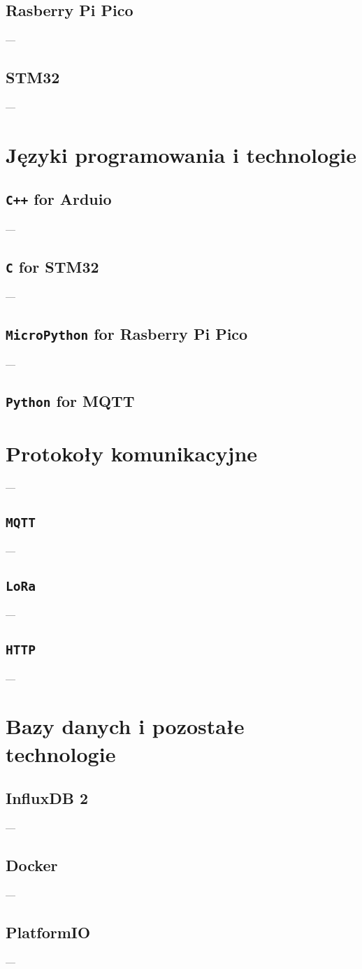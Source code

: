 \subsection{Rasberry Pi Pico}
---
\subsection{STM32}
---

\section{Języki programowania i technologie}
\subsection{\texttt{C++} for Arduio}
---
\subsection{\texttt{C} for STM32}
---
\subsection{\texttt{MicroPython} for Rasberry Pi Pico}
---
\subsection{\texttt{Python} for MQTT}

\section{Protokoły komunikacyjne}
---
\subsection{\texttt{MQTT}}
---
\subsection{\texttt{LoRa}}
---
\subsection{\texttt{HTTP}}
---
\section{Bazy danych i pozostałe technologie}
\subsection{InfluxDB 2}
---
\subsection{Docker}
---
\subsection{PlatformIO}
---
